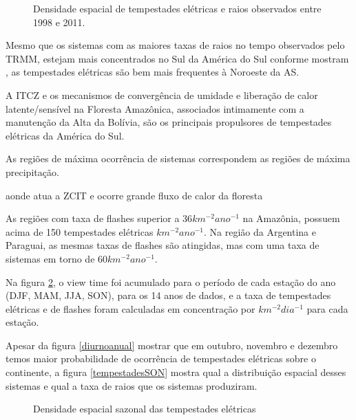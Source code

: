\begin{figure}[!ht]
\caption{Densidade espacial de tempestades elétricas e raios observados entre 1998 e 2011.}
\label{tempesRaios}
\end{figure}


Mesmo que os sistemas com as maiores taxas de raios no tempo observados pelo TRMM, estejam mais concentrados no Sul da América do Sul conforme mostram , as tempestades elétricas são bem mais frequentes à Noroeste da AS.

A ITCZ e os mecanismos de convergência de umidade e liberação de calor latente/sensível na Floresta Amazônica, associados intimamente com a manutenção da Alta da Bolívia, são os principais propulsores de tempestades elétricas da América do Sul. 

As regiões de máxima ocorrência de sistemas correspondem as regiões de máxima precipitação.


 aonde atua a ZCIT e ocorre grande fluxo de calor da floresta 

As regiões com taxa de flashes superior a 36$km^{-2}ano^{-1}$ na Amazônia, possuem acima de 150 tempestades elétricas $km^{-2}ano^{-1}$. Na região da Argentina e Paraguai, as mesmas taxas de flashes são atingidas, mas com uma taxa de sistemas em torno de 60$km^{-2}ano^{-1}$.  

Na figura \ref{DensidadeTempestadesSazonal}, o view time foi acumulado para o período de cada estação do ano (DJF, MAM, JJA, SON), para os 14 anos de dados, e a taxa de tempestades elétricas e de flashes foram calculadas em concentração por $km^{-2}dia^{-1}$ para cada estação. 

Apesar da figura \ref{diurnoanual} mostrar que em outubro, novembro e dezembro temos maior probabilidade de ocorrência de tempestades elétricas sobre o continente, a figura \ref{tempestadesSON} mostra qual a distribuição espacial desses sistemas e qual a taxa de raios que os sistemas produziram. 



\begin{figure}
  \caption{Densidade espacial sazonal das tempestades elétricas}
\label{DensidadeTempestadesSazonal}
\end{figure} 

